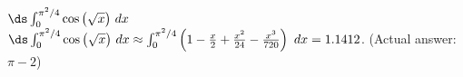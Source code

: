 {$\ds \int_0^{\pi^2/4} \cos \big(\sqrt{x}\big)\ dx$
}
{$\ds \int_0^{\pi^2/4} \cos \big(\sqrt{x}\big)\ dx \approx \int_0^{\pi^2/4} \left(1-\frac x2+\frac{x^2}{24}-\frac{x^3}{720}\right)\ dx = 1.1412$. (Actual answer: $\pi-2$)
}